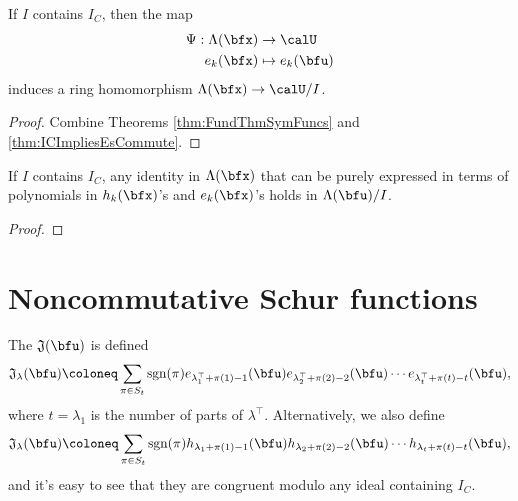 \documentclass{article}
\newcommand*\frkJ{\mathfrak{J}}
\newcommand*\sgn{\operatorname{sgn}}
\begin{document}
\begin{corollary}
    If $I$ contains $I_C$, then the map
    \begin{align*}
        \Psi:
        \Lambda(\bfx)
        &\to
        \calU
        \\
        e_k(\bfx)
        &\mapsto
        e_k(\bfu)
    \end{align*}
    induces a ring homomorphism $\Lambda(\bfx) \to \calU/I$.
\end{corollary}

\begin{proof}
    Combine Theorems \ref{thm:FundThmSymFuncs} and \ref{thm:ICImpliesEsCommute}.
\end{proof}

\begin{proposition}
    If $I$ contains $I_C$, any identity in $\Lambda(\bfx)$ that can be purely expressed in terms of polynomials in $h_k(\bfx)$'s and $e_k(\bfx)$'s holds in $\Lambda(\bfu)/I$.
\end{proposition}

\begin{proof}
\end{proof}

\section{
    Noncommutative Schur functions
}


\begin{definition}
    The  $\frkJ(\bfu)$ is defined 
    \[
        \frkJ_\lambda(\bfu)
        \coloneq
        \sum_{\pi \in S_{t}}
        \sgn(\pi)
        e_{\lambda^\top_1+\pi(1)-1}(\bfu)
        e_{\lambda^\top_2+\pi(2)-2}(\bfu)
        \cdots
        e_{\lambda^\top_{t}+\pi(t)-t}(\bfu),
    \]
    where $t = \lambda_1$ is the number of parts of $\lambda^\top$.
    Alternatively, we also define
    \[
        \frkJ_\lambda(\bfu)
        \coloneq
        \sum_{\pi \in S_{t}}
        \sgn(\pi)
        h_{\lambda_1+\pi(1)-1}(\bfu)
        h_{\lambda_2+\pi(2)-2}(\bfu)
        \cdots
        h_{\lambda_t+\pi(t)-t}(\bfu),
    \]
    and it's easy to see that they are congruent modulo any ideal containing $I_C$.
\end{definition}
\end{document}

